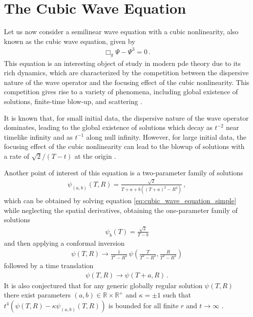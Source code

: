 \section{The Cubic Wave Equation}
\label{section:cubic_wave_equation}

Let us now consider a semilinear wave equation with a cubic nonlinearity, also known as the cubic wave equation, given by
%
\begin{align}
    \Box_g \Psi - \Psi^3 = 0 \, .
    \label{eq:cubic_wave_equation_simple}
\end{align}
%
This equation is an interesting object of study in modern \acrshort{pde} theory due to its rich dynamics, which are characterized by the competition between the dispersive nature of the wave operator and the focusing effect of the cubic nonlinearity. This competition gives rise to a variety of phenomena, including global existence of solutions, finite-time blow-up, and scattering \cite{Universality_of_global_dynamics_for_the_cubic_wave_equation,A_hyperboloidal_method_for_numerical_simulations_of_multidimensional_nonlinear_wave_equations}. 

It is known that, for small initial data, the dispersive nature of the wave operator dominates, leading to the global existence of solutions which decay as $t^{-2}$ near timelike infinity and as $t^{-1}$ along null infinity. However, for large initial data, the focusing effect of the cubic nonlinearity can lead to the blowup of solutions with a rate of $\sqrt{2}/(T-t)$ at the origin \cite{Universality_of_global_dynamics_for_the_cubic_wave_equation}.

Another point of interest of this equation is a two-parameter family of solutions 
%
\begin{align}
    \psi_{(a, b)}(T, R) = \frac{\sqrt{2}}{T + a + b \left( (T+ a)^2 - R^2 \right)} \, ,
\end{align}
%
which can be obtained by solving equation \eqref{eq:cubic_wave_equation_simple} while neglecting the spatial derivatives,
obtaining the one-parameter family of solutions
%
\begin{align}
    \psi_{b}(T) = \frac{\sqrt{2}}{T - b}
\end{align}
%
and then applying a conformal inversion 
%
\begin{align}
    \psi(T,R) \rightarrow \frac{1}{T^2 - R^2} \, \psi\left(\frac{T}{T^2 - R^2}, \frac{R}{T^2 - R^2}\right)
\end{align}
%
followed by a time translation
%
\begin{align}
    \psi(T,R) \rightarrow \psi(T + a, R) \, .
\end{align}
%
It is also conjectured that for any generic globally regular solution $\psi(T, R)$ there exist parameters $(a,b) \in \mathbb{R} \times \mathbb{R}^{+} $ and $\kappa = \pm 1$ such that $t^4 \left(\psi(T, R) - \kappa \psi_{(a, b)}(T, R) \right)$ is bounded for all finite $r$ and $t \to \infty$ \cite{Universality_of_global_dynamics_for_the_cubic_wave_equation}.

